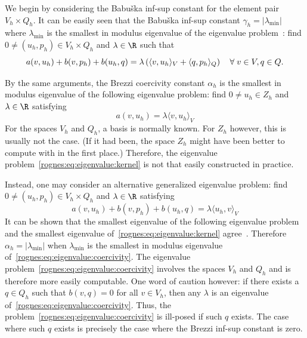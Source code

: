 We begin by considering the Babu\v ska inf-sup constant for the element
pair $V_h \times Q_h$. It can be easily seen that the Babu\v ska inf-sup
constant $\gamma_h = |\lambda_{\min}|$ where $\lambda_{\min}$ is the
smallest in modulus eigenvalue of the eigenvalue
problem~\cite{ArnoldRognes2009, Malkus1981}: find $0 \not =
(u_h, p_h) \in V_h \times Q_h$ and $\lambda \in \R$ such that
\begin{equation}
  \label{rognes:eq:eigenvalue:babuska}
  a(v, u_h) + b(v, p_h) + b(u_h, q)
  = \lambda
  \left (\langle v, u_h \rangle_{V} + \langle q, p_h \rangle_{Q} \right )
  \quad \forall \; v \in V, q \in Q.
\end{equation}

By the same arguments, the Brezzi coercivity constant $\alpha_h$ is
the smallest in modulus eigenvalue of the following eigenvalue
problem: find $0 \not = u_h \in Z_h$ and $\lambda \in \R$
satisfying
\begin{equation}
  \label{rognes:eq:eigenvalue:kernel}
  a(v, u_h) = \lambda \langle v, u_h \rangle_{V}
\end{equation}
For the spaces $V_h$ and $Q_h$, a basis is normally known. For $Z_h$
however, this is usually not the case. (If it had been, the space
$Z_h$ might have been better to compute with in the first place.)
Therefore, the eigenvalue problem~\eqref{rognes:eq:eigenvalue:kernel} is not
that easily constructed in practice.

Instead, one may consider an alternative generalized eigenvalue
problem: find $0 \not = (u_h, p_h) \in V_h \times Q_h$ and $\lambda
\in \R$ satisfying
\begin{equation}
  \label{rognes:eq:eigenvalue:coercivity}
  a(v, u_h) + b(v, p_h) + b(u_h, q) = \lambda \langle u_h, v \rangle_{V}
\end{equation}
It can be shown that the smallest eigenvalue of the following
eigenvalue problem and the smallest eigenvalue
of~\eqref{rognes:eq:eigenvalue:kernel}
agree~\cite{ArnoldRognes2009}. Therefore $\alpha_h = |\lambda_{\min}|$
when $\lambda_{\min}$ is the smallest in modulus eigenvalue
of~\eqref{rognes:eq:eigenvalue:coercivity}. The eigenvalue
problem~\eqref{rognes:eq:eigenvalue:coercivity} involves the spaces
$V_h$ and $Q_h$ and is therefore more easily computable. One word of
caution however: if there exists a $q \in Q_h$ such that $b(v, q) = 0$
for all $v \in V_h$, then any $\lambda$ is an eigenvalue
of~\eqref{rognes:eq:eigenvalue:coercivity}. Thus, the
problem~\eqref{rognes:eq:eigenvalue:coercivity} is ill-posed if such
$q$ exists. The case where such $q$ exists is precisely the case where
the Brezzi inf-sup constant is zero.

